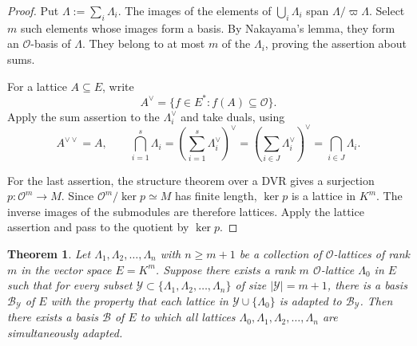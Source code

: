 \documentclass[12pt]{amsart}
\newtheorem{theorem}{Theorem}[section]
\theoremstyle{definition}
\theoremstyle{remark}
\begin{document}
\begin{proof}
Put $\Lambda:=\sum\limits_i\Lambda_i$. The images of the elements of $\bigcup\limits_i\Lambda_i$ span $\Lambda/\varpi \Lambda$. Select $m$ such elements whose images form a basis. By Nakayama's lemma, they form an $\mathcal O$-basis of $\Lambda$. They belong to at most $m$ of the $\Lambda_i$, proving the assertion about sums.

For a lattice $A\subseteq E$, write
\[
  A^\vee=\{f\in E^*:f(A)\subseteq\mathcal O\}.
\]
Apply the sum assertion to the $\Lambda_i^\vee$ and take duals, using
\[
  A^{\vee\vee}=A,\qquad
  \bigcap\limits_{i=1}^s\Lambda_i
  =\left(\sum_{i=1}^s\Lambda_i^\vee\right)^\vee
  =\left(\sum_{i\in J}\Lambda_i^\vee\right)^\vee
  =\bigcap\limits_{i\in J}\Lambda_i.
\]

For the last assertion, the structure theorem over a DVR gives a surjection $p:\mathcal O^m\to M$. Since $\mathcal O^m/\ker p\simeq M$ has finite length, $\ker p$ is a lattice in $K^m$. The inverse images of the submodules are therefore lattices. Apply the lattice assertion and pass to the quotient by $\ker p$.
\end{proof}

\begin{theorem} \label{th-main-body}
    Let $\Lambda_1, \Lambda_2, \dots, \Lambda_n$ with $n\ge m+1$ be a collection of $\mathcal{O}$-lattices of rank $m$ in the vector space $E=K^m$. 
    Suppose there exists a rank $m$ $\mathcal{O}$-lattice $\Lambda_0$ in $E$ such that for every subset $\mathcal{Y} \subset \{\Lambda_1, \Lambda_2, \dots, \Lambda_n\}$ of size $|\mathcal{Y}| = m+1$, there is a basis $\mathcal{B}_{\mathcal{Y}}$ of $E$ with the property that each lattice in $\mathcal{Y}\cup\{\Lambda_0\}$ is adapted to $\mathcal{B}_{\mathcal{Y}}$.  
    Then there exists a basis $\mathcal{B}$ of $E$ to which all lattices $\Lambda_0,\Lambda_1, \Lambda_2, \dots, \Lambda_n$ are simultaneously adapted.
\end{theorem}
\end{document}
